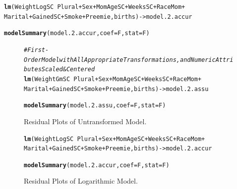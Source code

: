 \documentclass{article}\usepackage[]{graphicx}\usepackage[]{xcolor}
\makeatletter
\newcommand{\hlcom}[1]{\textcolor[rgb]{0.678,0.584,0.686}{\textit{#1}}}%
\newcommand{\hlopt}[1]{\textcolor[rgb]{0,0,0}{#1}}%
\newcommand{\hlstd}[1]{\textcolor[rgb]{0.345,0.345,0.345}{#1}}%
\newcommand{\hlkwb}[1]{\textcolor[rgb]{0.69,0.353,0.396}{#1}}%
\newcommand{\hlkwc}[1]{\textcolor[rgb]{0.333,0.667,0.333}{#1}}%
\newcommand{\hlkwd}[1]{\textcolor[rgb]{0.737,0.353,0.396}{\textbf{#1}}}%
\newenvironment{kframe}{%
 \def\at@end@of@kframe{}%
 \ifinner\ifhmode%
  \def\at@end@of@kframe{\end{minipage}}%
  \begin{minipage}{\columnwidth}%
 \fi\fi%
 \def\FrameCommand##1{\hskip\@totalleftmargin \hskip-\fboxsep
 \colorbox{shadecolor}{##1}\hskip-\fboxsep
     \hskip-\linewidth \hskip-\@totalleftmargin \hskip\columnwidth}%
 \MakeFramed {\advance\hsize-\width
   \@totalleftmargin\z@ \linewidth\hsize
   \@setminipage}}%
 {\par\unskip\endMakeFramed%
 \at@end@of@kframe}
\newenvironment{knitrout}{}{} %
\makeatother
\begin{document}
\begin{knitrout}
\color{fgcolor}\begin{kframe}
\begin{alltt}
\hlkwd{lm}\hlstd{(WeightLogSC} \hlopt{~} \hlstd{Plural} \hlopt{+} \hlstd{Sex} \hlopt{+} \hlstd{MomAgeSC} \hlopt{+} \hlstd{WeeksSC} \hlopt{+} \hlstd{RaceMom} \hlopt{+}
     \hlstd{Marital} \hlopt{+} \hlstd{GainedSC} \hlopt{+} \hlstd{Smoke} \hlopt{+} \hlstd{Preemie, births)} \hlkwb{->} \hlstd{model.2.accur}

\hlkwd{modelSummary}\hlstd{(model.2.accur,} \hlkwc{coef}\hlstd{=F,} \hlkwc{stat}\hlstd{=F)}
\end{alltt}
\end{kframe}
\end{knitrout}

\begin{figure}
\begin{knitrout}
\color{fgcolor}\begin{kframe}
\begin{alltt}
\hlcom{#First-Order Model with All Appropriate Transformations, and Numeric Attributes Scaled & Centered}
\hlkwd{lm}\hlstd{(WeightGmSC} \hlopt{~} \hlstd{Plural} \hlopt{+} \hlstd{Sex} \hlopt{+} \hlstd{MomAgeSC} \hlopt{+} \hlstd{WeeksSC} \hlopt{+} \hlstd{RaceMom} \hlopt{+}
     \hlstd{Marital} \hlopt{+} \hlstd{GainedSC} \hlopt{+} \hlstd{Smoke} \hlopt{+} \hlstd{Preemie, births)} \hlkwb{->} \hlstd{model.2.assu}

\hlkwd{modelSummary}\hlstd{(model.2.assu,} \hlkwc{coef}\hlstd{=F,} \hlkwc{stat}\hlstd{=F)}
\end{alltt}
\end{kframe}
\end{knitrout}
\caption{Residual Plots of Untransformed Model.} 
\label{resid.plots.un}
\end{figure}

\begin{figure}
\begin{knitrout}
\color{fgcolor}\begin{kframe}
\begin{alltt}
\hlkwd{lm}\hlstd{(WeightLogSC} \hlopt{~} \hlstd{Plural} \hlopt{+} \hlstd{Sex} \hlopt{+} \hlstd{MomAgeSC} \hlopt{+} \hlstd{WeeksSC} \hlopt{+} \hlstd{RaceMom} \hlopt{+}
     \hlstd{Marital} \hlopt{+} \hlstd{GainedSC} \hlopt{+} \hlstd{Smoke} \hlopt{+} \hlstd{Preemie, births)} \hlkwb{->} \hlstd{model.2.accur}

\hlkwd{modelSummary}\hlstd{(model.2.accur,} \hlkwc{coef}\hlstd{=F,} \hlkwc{stat}\hlstd{=F)}
\end{alltt}
\end{kframe}
\end{knitrout}
\caption{Residual Plots of Logarithmic Model.} 
\label{resid.plots.log}
\end{figure}
\end{document}
